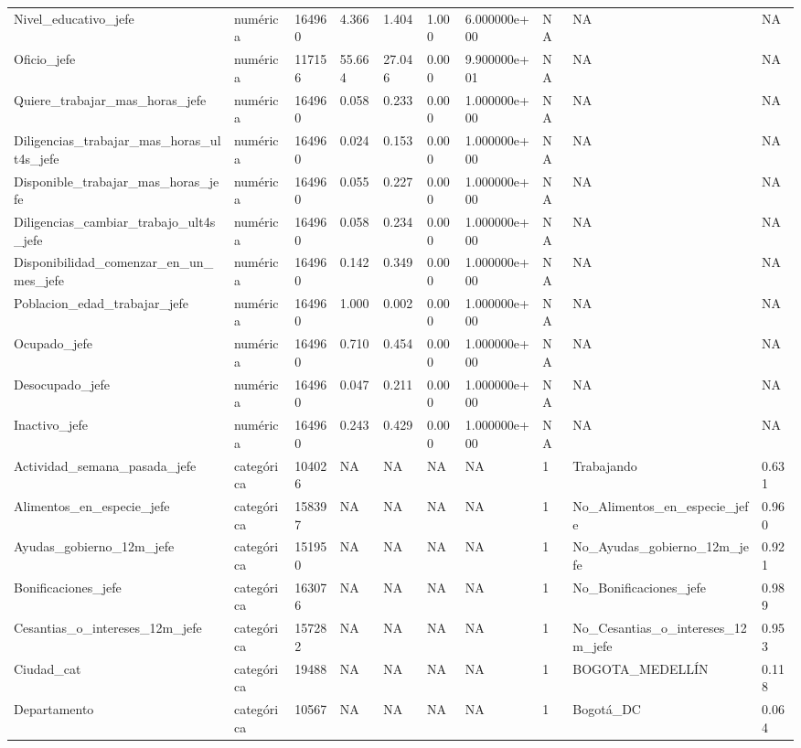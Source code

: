 \begin{longtable}[t]{llllllllll}
Nivel\_educativo\_jefe & numérica & 164960 & 4.366 & 1.404 & 1.000 & 6.000000e+00 & NA & NA & NA\\
Oficio\_jefe & numérica & 117156 & 55.664 & 27.046 & 0.000 & 9.900000e+01 & NA & NA & NA\\
Quiere\_trabajar\_mas\_horas\_jefe & numérica & 164960 & 0.058 & 0.233 & 0.000 & 1.000000e+00 & NA & NA & NA\\
Diligencias\_trabajar\_mas\_horas\_ult4s\_jefe & numérica & 164960 & 0.024 & 0.153 & 0.000 & 1.000000e+00 & NA & NA & NA\\
Disponible\_trabajar\_mas\_horas\_jefe & numérica & 164960 & 0.055 & 0.227 & 0.000 & 1.000000e+00 & NA & NA & NA\\
Diligencias\_cambiar\_trabajo\_ult4s\_jefe & numérica & 164960 & 0.058 & 0.234 & 0.000 & 1.000000e+00 & NA & NA & NA\\
Disponibilidad\_comenzar\_en\_un\_mes\_jefe & numérica & 164960 & 0.142 & 0.349 & 0.000 & 1.000000e+00 & NA & NA & NA\\
Poblacion\_edad\_trabajar\_jefe & numérica & 164960 & 1.000 & 0.002 & 0.000 & 1.000000e+00 & NA & NA & NA\\
Ocupado\_jefe & numérica & 164960 & 0.710 & 0.454 & 0.000 & 1.000000e+00 & NA & NA & NA\\
Desocupado\_jefe & numérica & 164960 & 0.047 & 0.211 & 0.000 & 1.000000e+00 & NA & NA & NA\\
Inactivo\_jefe & numérica & 164960 & 0.243 & 0.429 & 0.000 & 1.000000e+00 & NA & NA & NA\\
Actividad\_semana\_pasada\_jefe & categórica & 104026 & NA & NA & NA & NA & 1 & Trabajando & 0.631\\
Alimentos\_en\_especie\_jefe & categórica & 158397 & NA & NA & NA & NA & 1 & No\_Alimentos\_en\_especie\_jefe & 0.960\\
Ayudas\_gobierno\_12m\_jefe & categórica & 151950 & NA & NA & NA & NA & 1 & No\_Ayudas\_gobierno\_12m\_jefe & 0.921\\
Bonificaciones\_jefe & categórica & 163076 & NA & NA & NA & NA & 1 & No\_Bonificaciones\_jefe & 0.989\\
Cesantias\_o\_intereses\_12m\_jefe & categórica & 157282 & NA & NA & NA & NA & 1 & No\_Cesantias\_o\_intereses\_12m\_jefe & 0.953\\
Ciudad\_cat & categórica & 19488 & NA & NA & NA & NA & 1 & BOGOTA\_MEDELLÍN & 0.118\\
Departamento & categórica & 10567 & NA & NA & NA & NA & 1 & Bogotá\_DC & 0.064\\

\end{longtable}

